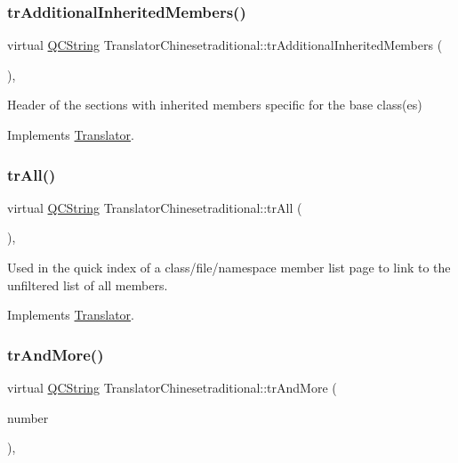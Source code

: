 \subsubsection{\texorpdfstring{trAdditionalInheritedMembers()}{trAdditionalInheritedMembers()}}
{\footnotesize\ttfamily virtual \mbox{\hyperlink{class_q_c_string}{Q\+C\+String}} Translator\+Chinesetraditional\+::tr\+Additional\+Inherited\+Members (\begin{DoxyParamCaption}{ }\end{DoxyParamCaption})\hspace{0.3cm}{\ttfamily [inline]}, {\ttfamily [virtual]}}

Header of the sections with inherited members specific for the base class(es) 

Implements \mbox{\hyperlink{class_translator}{Translator}}.

\mbox{\label{class_translator_chinesetraditional_aa1b51ab16b0482c3bd451cb82dceb6f7}} 
\subsubsection{\texorpdfstring{trAll()}{trAll()}}
{\footnotesize\ttfamily virtual \mbox{\hyperlink{class_q_c_string}{Q\+C\+String}} Translator\+Chinesetraditional\+::tr\+All (\begin{DoxyParamCaption}{ }\end{DoxyParamCaption})\hspace{0.3cm}{\ttfamily [inline]}, {\ttfamily [virtual]}}

Used in the quick index of a class/file/namespace member list page to link to the unfiltered list of all members. 

Implements \mbox{\hyperlink{class_translator}{Translator}}.

\mbox{\label{class_translator_chinesetraditional_a6f3733294331a8692ba66be8f52653d7}} 
\subsubsection{\texorpdfstring{trAndMore()}{trAndMore()}}
{\footnotesize\ttfamily virtual \mbox{\hyperlink{class_q_c_string}{Q\+C\+String}} Translator\+Chinesetraditional\+::tr\+And\+More (\begin{DoxyParamCaption}\item[{const \mbox{\hyperlink{class_q_c_string}{Q\+C\+String}} \&}]{number }\end{DoxyParamCaption})\hspace{0.3cm}{\ttfamily [inline]}, {\ttfamily [virtual]}}

